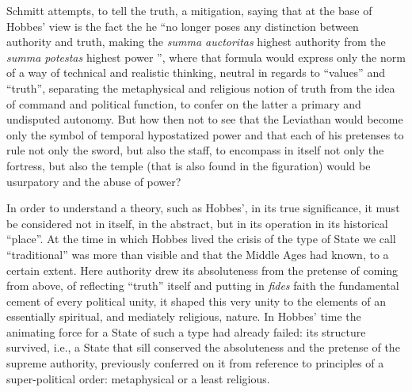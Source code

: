 Schmitt attempts, to tell the truth, a mitigation, saying that at the base of Hobbes' view is the fact the he ``no longer poses any distinction between authority and truth, making the \emph{summa auctoritas} highest authority from the \emph{summa potestas} highest power '', where that formula would express only the norm of a way of technical and realistic thinking, neutral in regards to ``values'' and ``truth'', separating the metaphysical and religious notion of truth from the idea of command and political function, to confer on the latter a primary and undisputed autonomy. But how then not to see that the Leviathan would become only the symbol of temporal hypostatized power and that each of his pretenses to rule not only the sword, but also the staff, to encompass in itself not only the fortress, but also the temple (that is also found in the figuration) would be usurpatory and the abuse of power?

In order to understand a theory, such as Hobbes', in its true significance, it must be considered not in itself, in the abstract, but in its operation in its historical ``place''. At the time in which Hobbes lived the crisis of the type of State we call ``traditional'' was more than visible and that the Middle Ages had known, to a certain extent. Here authority drew its absoluteness from the pretense of coming from above, of reflecting ``truth'' itself and putting in \emph{fides} faith the fundamental cement of every political unity, it shaped this very unity to the elements of an essentially spiritual, and mediately religious, nature. In Hobbes' time the animating force for a State of such a type had already failed: its structure survived, i.e., a State that sill conserved the absoluteness and the pretense of the supreme authority, previously conferred on it from reference to principles of a super-political order: metaphysical or a least religious.

